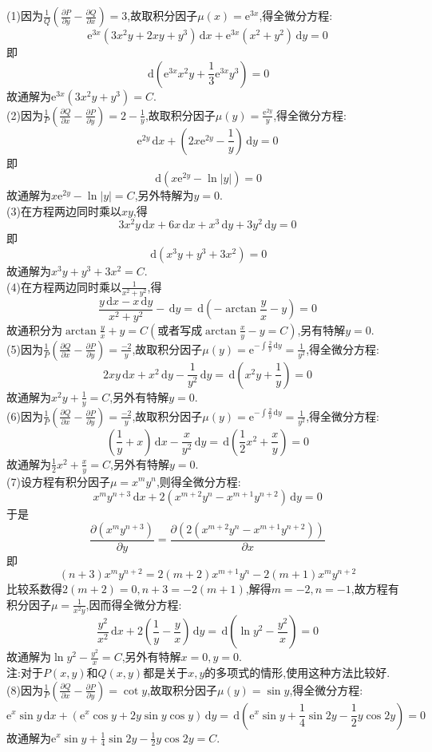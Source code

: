 \documentclass[titlepage,11pt,a4paper,twoside]{report}
\makeatletter
\newcommand\diff{\,\mathrm{d}}
\newcommand\e{\mathrm{e}}
\newenvironment{solve}{\par
	\pushQED{\qed}%
	\normalfont \topsep1\p@\@plus6\p@\relax
	\trivlist
	\item\relax
	{\hspace*{\parindent}{\heiti 解}\@addpunct{:}}\hspace\labelsep\ignorespaces
}{%
	\popQED\endtrivlist\@endpefalse
}
\makeatother
\begin{document}
\begin{solve}
(1)因为$\frac{1}{Q}\left(\frac{\partial P}{\partial y}-\frac{\partial Q}{\partial x}\right)=3$,故取积分因子$\mu(x)=\e^{3x}$,得全微分方程:
\[\e^{3x}(3x^2y+2xy+y^3)\diff x+\e^{3x}(x^2+y^2)\diff y=0\]
即\[\diff\left(\e^{3x}x^2y+\frac{1}{3}\e^{3x}y^3\right)=0\]
故通解为$\e^{3x}(3x^2y+y^3)=C$.\\
(2)因为$\frac{1}{P}\left(\frac{\partial Q}{\partial x}-\frac{\partial P}{\partial y}\right)=2-\frac{1}{y}$,故取积分因子$\mu(y)=\frac{\e^{2y}}{y}$,得全微分方程:
\[\e^{2y}\diff x+\left(2x\e^{2y}-\frac{1}{y}\right)\diff y=0\]
即\[\diff\left(x\e^{2y}-\ln|y|\right)=0\]
故通解为$x\e^{2y}-\ln|y|=C$,另外特解为$y=0$.\\
(3)在方程两边同时乘以$xy$,得
\[3x^2y\diff x+6x\diff x+x^3\diff y+3y^2\diff y=0\]
即\[\diff(x^3y+y^3+3x^2)=0\]
故通解为$x^3y+y^3+3x^2=C$.\\
(4)在方程两边同时乘以$\frac{1}{x^2+y^2}$,得
\[\frac{y\diff x-x\diff y}{x^2+y^2}-\diff y=\diff\left(-\arctan\frac{y}{x}-y\right)=0\]
故通积分为$\arctan\frac{y}{x}+y=C(\mbox{或者写成}\arctan\frac{x}{y}-y=C)$,另有特解$y=0$.\\
(5)因为$\frac{1}{P}\left(\frac{\partial Q}{\partial x}-\frac{\partial P}{\partial y}\right)=\frac{-2}{y}$,故取积分因子$\mu(y)=\e^{-\int\frac{2}{y}\diff y}=\frac{1}{y^2}$,得全微分方程:
\[2xy\diff x+x^2\diff y-\frac{1}{y^2}\diff y=\diff\left(x^2y+\frac{1}{y}\right)=0\]
故通解为$x^2y+\frac{1}{y}=C$,另外有特解$y=0$.\\
(6)因为$\frac{1}{P}\left(\frac{\partial Q}{\partial x}-\frac{\partial P}{\partial y}\right)=\frac{-2}{y}$,故取积分因子$\mu(y)=\e^{-\int\frac{2}{y}\diff y}=\frac{1}{y^2}$,得全微分方程:
\[\left(\frac{1}{y}+x\right)\diff x-\frac{x}{y^2}\diff y=\diff\left(\frac{1}{2}x^2+\frac{x}{y}\right)=0\]
故通解为$\frac{1}{2}x^2+\frac{x}{y}=C$,另外有特解$y=0$.\\
(7)设方程有积分因子$\mu=x^my^n$,则得全微分方程:
\[x^my^{n+3}\diff x+2(x^{m+2}y^n-x^{m+1}y^{n+2})\diff y=0\]
于是
\[\frac{\partial\left(x^my^{n+3}\right)}{\partial y}=\frac{\partial\left(2\left(x^{m+2}y^n-x^{m+1}y^{n+2}\right)\right)}{\partial x}\]
即
\[(n+3)x^my^{n+2}=2(m+2)x^{m+1}y^n-2(m+1)x^my^{n+2}\]
比较系数得$2(m+2)=0,n+3=-2(m+1)$,解得$m=-2,n=-1$,故方程有积分因子$\mu=\frac{1}{x^2y}$,因而得全微分方程:
\[\frac{y^2}{x^2}\diff x+2\left(\frac{1}{y}-\frac{y}{x}\right)\diff y=\diff\left(\ln y^2-\frac{y^2}{x}\right)=0\]
故通解为$\ln y^2-\frac{y^2}{x}=C$,另外有特解$x=0,y=0$.\\
注:对于$P(x,y)$和$Q(x,y)$都是关于$x,y$的多项式的情形,使用这种方法比较好.\\
(8)因为$\frac{1}{P}\left(\frac{\partial Q}{\partial x}-\frac{\partial P}{\partial y}\right)=\cot y$,故取积分因子$\mu(y)=\sin y$,得全微分方程:
\[\e^x\sin y\diff x+\left(\e^x\cos y+2y\sin y\cos y\right)\diff y=\diff\left(\e^x\sin y+\frac{1}{4}\sin2y-\frac{1}{2}y\cos2y\right)=0\]
故通解为$\e^x\sin y+\frac{1}{4}\sin2y-\frac{1}{2}y\cos2y=C$.
\end{solve}
\end{document}
